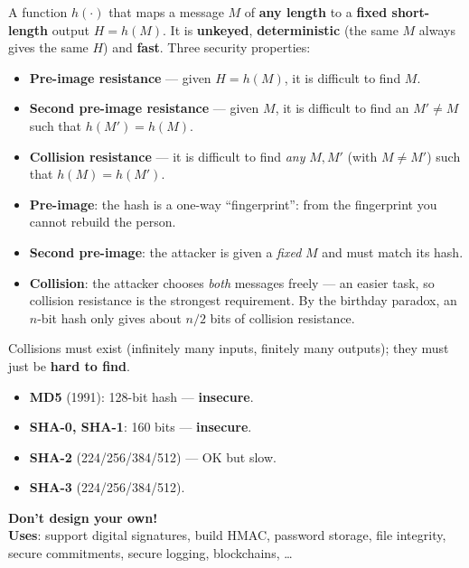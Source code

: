 \begin{defnbox}[title=Hash function]
A function $h(\cdot)$ that maps a message $M$ of \textbf{any length} to a \textbf{fixed
short-length} output $H = h(M)$. It is \textbf{unkeyed}, \textbf{deterministic} (the same $M$
always gives the same $H$) and \textbf{fast}. Three security properties:
\begin{itemize}
  \item \textbf{Pre-image resistance} --- given $H = h(M)$, it is difficult to find $M$.
  \item \textbf{Second pre-image resistance} --- given $M$, it is difficult to find an
        $M' \neq M$ such that $h(M') = h(M)$.
  \item \textbf{Collision resistance} --- it is difficult to find \emph{any} $M, M'$
        (with $M \neq M'$) such that $h(M) = h(M')$.
\end{itemize}
\end{defnbox}

\begin{rembox}[title=Understanding the three properties]
\begin{itemize}
  \item \textbf{Pre-image}: the hash is a one-way ``fingerprint'': from the fingerprint
        you cannot rebuild the person.
  \item \textbf{Second pre-image}: the attacker is given a \emph{fixed} $M$ and must
        match its hash.
  \item \textbf{Collision}: the attacker chooses \emph{both} messages freely --- an easier
        task, so collision resistance is the strongest requirement. By the birthday
        paradox, an $n$-bit hash only gives about $n/2$ bits of collision resistance.
\end{itemize}
Collisions must exist (infinitely many inputs, finitely many outputs); they must just be
\textbf{hard to find}.
\end{rembox}

\begin{propbox}[title=Standard hash functions]
\begin{itemize}
  \item \textbf{MD5} (1991): 128-bit hash --- \textbf{insecure}.
  \item \textbf{SHA-0, SHA-1}: 160 bits --- \textbf{insecure}.
  \item \textbf{SHA-2} (224/256/384/512) --- OK but slow.
  \item \textbf{SHA-3} (224/256/384/512).
\end{itemize}
\textbf{Don't design your own!} \\
\textbf{Uses}: support digital signatures, build HMAC, password storage, file integrity,
secure commitments, secure logging, blockchains, \ldots
\end{propbox}

